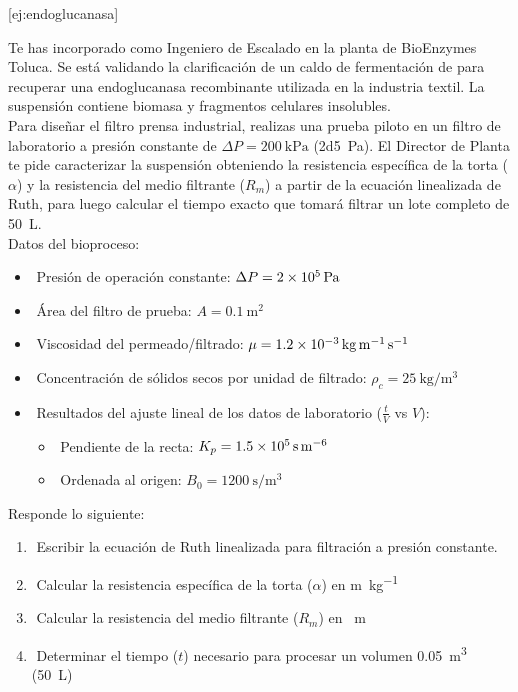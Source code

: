 [ej:endoglucanasa]{
    Te has incorporado como Ingeniero de Escalado en la planta de BioEnzymes Toluca. Se está validando la clarificación de un caldo de fermentación de  para recuperar una endoglucanasa recombinante utilizada en la industria textil. La suspensión contiene biomasa y fragmentos celulares insolubles. \\
    Para diseñar el filtro prensa industrial, realizas una prueba piloto en un filtro de laboratorio a presión constante de $\Delta P = \qty{200}{\kilo\pascal}$ (\qty{2d5}{\pascal}). El Director de Planta te pide caracterizar la suspensión obteniendo la resistencia específica de la torta ($\alpha$) y la resistencia del medio filtrante ($R_{m}$) a partir de la ecuación linealizada de Ruth, para luego calcular el tiempo exacto que tomará filtrar un lote completo de \qty{50}{\L}. \\
    Datos del bioproceso:
    \begin{itemize}
        \item​ Presión de operación constante: $\Delta P = \qty{2d5}{\pascal}$ 
        \item​ Área del filtro de prueba: $A = \qty{0.1}{\m\squared}$ 
        \item​ Viscosidad del permeado/filtrado: $\mu = \qty{1.2d-3}{\kg\per\m\per\s}$ 
        \item​ Concentración de sólidos secos por unidad de filtrado: $\rho_{c} = \qty{25}{\kg\per\m\cubed}$ 
        \item​ Resultados del ajuste lineal de los datos de laboratorio ($\frac{t}{V}$ vs $V$): 
            \begin{itemize}
                \item​ Pendiente de la recta: $K_{p} = \qty{1.5d5}{\s\per\m\tothe{6}}$
                \item​ Ordenada al origen: $B_{0} = \qty{1200}{\s\per\m\cubed}$
            \end{itemize}    
    \end{itemize}
    Responde lo siguiente:
    \begin{enumerate}
        \item​ Escribir la ecuación de Ruth linealizada para filtración a presión constante. 
        \item​ Calcular la resistencia específica de la torta ($\alpha$) en \unit{\m\per\kg} 
        \item​ Calcular la resistencia del medio filtrante ($R_{m}$) en \unit{\per\m}
        \item​ Determinar el tiempo ($t$) necesario para procesar un volumen \qty{0.05}{\m\cubed} (\qty{50}{\L})
    \end{enumerate}
}